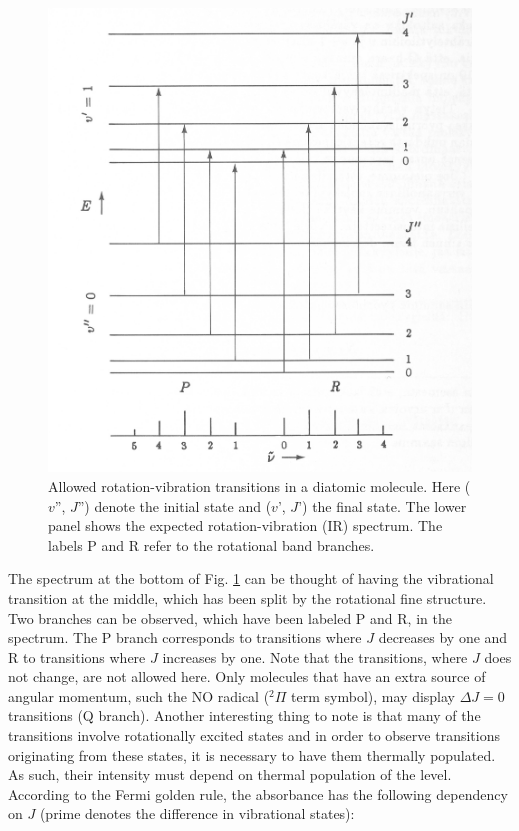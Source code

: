 \documentclass[byrevtex,amssymb,aps,pra,floatfix,letterpaper]{revtex4}
\begin{document}
\begin{figure}[!htp]
\begin{center}
\includegraphics[scale=0.4]{fig2}
\caption{Allowed rotation-vibration transitions in a diatomic molecule. Here ($v$'', $J$'') denote the initial state and ($v$', $J$') the final state. The lower panel shows the expected rotation-vibration (IR) spectrum. The labels P and R refer to the rotational band branches.}
\label{fig2}
\end{center}
\end{figure}

The spectrum at the bottom of Fig. \ref{fig2} can be thought of having the vibrational transition at the middle, which has been split by the rotational fine structure. Two branches can be observed, which have been labeled P and R, in the spectrum. The P branch corresponds to transitions where $J$ decreases by one and R to transitions where $J$ increases by one. Note that the transitions, where $J$ does not change, are not allowed here. Only molecules that have an extra source of angular momentum, such the NO radical ($^2\Pi$ term symbol), may display $\Delta J = 0$ transitions (Q branch). Another interesting thing to note is that many
of the transitions involve rotationally excited states and in order to observe transitions originating from these states, it is necessary to have them thermally populated. As such, their intensity must depend on thermal population of the level. According to the Fermi golden rule, the absorbance has the following dependency on $J$ (prime denotes the difference in vibrational states):
\end{document}
